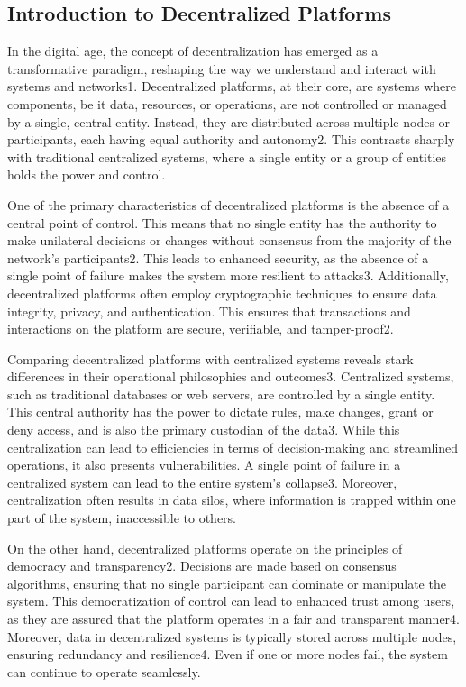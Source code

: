 \subsection{Introduction to Decentralized Platforms}
In the digital age, the concept of decentralization has emerged as a transformative paradigm, reshaping the way we understand and interact with systems and networks1. Decentralized platforms, at their core, are systems where components, be it data, resources, or operations, are not controlled or managed by a single, central entity. Instead, they are distributed across multiple nodes or participants, each having equal authority and autonomy2. This contrasts sharply with traditional centralized systems, where a single entity or a group of entities holds the power and control.

One of the primary characteristics of decentralized platforms is the absence of a central point of control. This means that no single entity has the authority to make unilateral decisions or changes without consensus from the majority of the network's participants2. This leads to enhanced security, as the absence of a single point of failure makes the system more resilient to attacks3. Additionally, decentralized platforms often employ cryptographic techniques to ensure data integrity, privacy, and authentication. This ensures that transactions and interactions on the platform are secure, verifiable, and tamper-proof2.

Comparing decentralized platforms with centralized systems reveals stark differences in their operational philosophies and outcomes3. Centralized systems, such as traditional databases or web servers, are controlled by a single entity. This central authority has the power to dictate rules, make changes, grant or deny access, and is also the primary custodian of the data3. While this centralization can lead to efficiencies in terms of decision-making and streamlined operations, it also presents vulnerabilities. A single point of failure in a centralized system can lead to the entire system's collapse3. Moreover, centralization often results in data silos, where information is trapped within one part of the system, inaccessible to others.

On the other hand, decentralized platforms operate on the principles of democracy and transparency2. Decisions are made based on consensus algorithms, ensuring that no single participant can dominate or manipulate the system. This democratization of control can lead to enhanced trust among users, as they are assured that the platform operates in a fair and transparent manner4. Moreover, data in decentralized systems is typically stored across multiple nodes, ensuring redundancy and resilience4. Even if one or more nodes fail, the system can continue to operate seamlessly.

